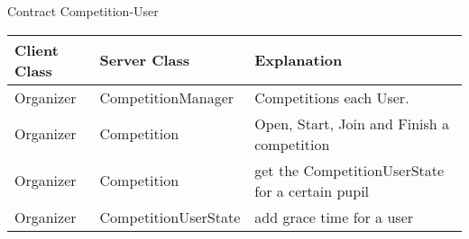 \begin{subsubsection}{Contract Competition-User}
	\begin{tabular}{l l l }
	  Client Class & Server Class & Explanation\\ \hline
	  Organizer & CompetitionManager & Competitions each User.\\
	  Organizer & Competition & Open, Start, Join and Finish a competition\\
	  Organizer & Competition & get the CompetitionUserState for a certain pupil\\
	  Organizer & CompetitionUserState & add grace time for a user\\
	\end{tabular}
\end{subsubsection}